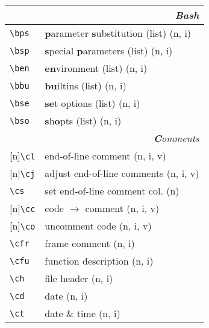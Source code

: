 \documentclass[oneside,11pt,landscape,DIV16]{scrartcl}
\newcommand{\Rep}{{\scriptsize{[n]}}}
\begin{document}
\begin{multicols}{3}
\begin{center}
\begin{tabular}[]{|p{11mm}|p{60mm}|}
\hline 
\multicolumn{2}{|r|}{\textsl{\textbf{B}ash}}\\[1.0ex]
\hline \verb'\bps'   & \textbf{p}arameter \textbf{s}ubstitution (list) \hfill (n, i)\\
\hline \verb'\bsp'   & \textbf{s}pecial \textbf{p}arameters (list)     \hfill (n, i)\\
\hline \verb'\ben'   & \textbf{en}vironment (list)                     \hfill (n, i)\\
\hline \verb'\bbu'   & \textbf{bu}iltins (list)                        \hfill (n, i)\\
\hline \verb'\bse'   & \textbf{se}t options (list)                     \hfill (n, i)\\
\hline \verb'\bso'   & \textbf{s}h\textbf{o}pts (list)                 \hfill (n, i)\\
\hline 
\hline
\multicolumn{2}{|r|}{\textsl{\textbf{C}omments}}                       \\[1.0ex]
\hline \Rep\verb'\cl'   & end-of-line comment               \hfill (n, i, v)\\
\hline \Rep\verb'\cj'   & adjust end-of-line comments       \hfill (n, i, v)\\
\hline     \verb'\cs'   & set end-of-line comment col.      \hfill (n)\\
%
\hline \Rep\verb'\cc'   & code $\rightarrow$ comment        \hfill (n, i, v)\\
\hline \Rep\verb'\co'   & uncomment code                    \hfill (n, i, v)\\
%
\hline     \verb'\cfr'  & frame comment                     \hfill (n, i)\\
\hline     \verb'\cfu'  & function description              \hfill (n, i)\\
\hline     \verb'\ch'   & file header                       \hfill (n, i)\\
\hline     \verb'\cd'   & date                              \hfill (n, i)\\
\hline     \verb'\ct'   & date \& time                      \hfill (n, i)\\
\hline
\end{tabular}\\
%
\vfill
%
\begin{minipage}[b]{75mm}%
\scriptsize{%
\vspace{1mm}
}
\end{minipage}
\end{center}
\end{multicols}
\end{document}
